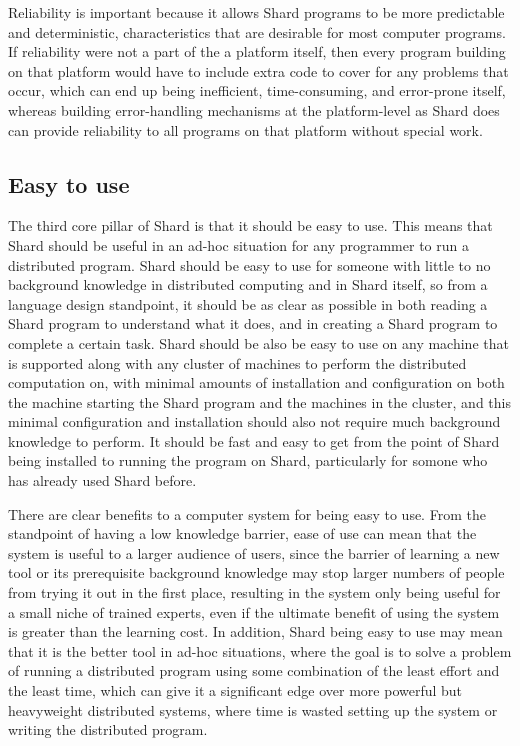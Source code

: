 \documentclass[twoside]{report}
\begin{document}
Reliability is important because it allows Shard programs to be more predictable and deterministic, characteristics that are desirable for most computer programs. If reliability were not a part of the a platform itself, then every program building on that platform would have to include extra code to cover for any problems that occur, which can end up being inefficient, time-consuming, and error-prone itself, whereas building error-handling mechanisms at the platform-level as Shard does can provide reliability to all programs on that platform without special work.

\subsection{Easy to use}

The third core pillar of Shard is that it should be easy to use.
This means that Shard should be useful in an ad-hoc situation for any programmer to run a distributed program.
Shard should be easy to use for someone with little to no background knowledge in distributed computing and in Shard itself, so from a language design standpoint, it should be as clear as possible in both reading a Shard program to understand what it does, and in creating a Shard program to complete a certain task.
Shard should be also be easy to use on any machine that is supported along with any cluster of machines to perform the distributed computation on, with minimal amounts of installation and configuration on both the machine starting the Shard program and the machines in the cluster, and this minimal configuration and installation should also not require much background knowledge to perform.
It should be fast and easy to get from the point of Shard being installed to running the program on Shard, particularly for somone who has already used Shard before.

There are clear benefits to a computer system for being easy to use.
From the standpoint of having a low knowledge barrier, ease of use can mean that the system is useful to a larger audience of users, since the barrier of learning a new tool or its prerequisite background knowledge may stop larger numbers of people from trying it out in the first place, resulting in the system only being useful for a small niche of trained experts, even if the ultimate benefit of using the system is greater than the learning cost.
In addition, Shard being easy to use may mean that it is the better tool in ad-hoc situations, where the goal is to solve a problem of running a distributed program using some combination of the least effort and the least time, which can give it a significant edge over more powerful but heavyweight distributed systems, where time is wasted setting up the system or writing the distributed program.
\end{document}
